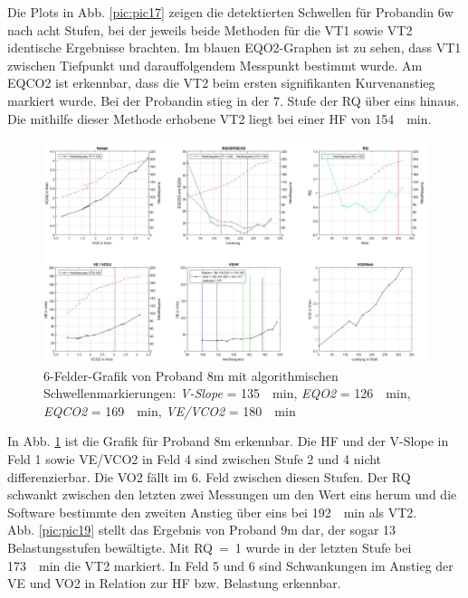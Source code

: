 %
Die Plots in Abb. \ref{pic:pic17} zeigen die detektierten Schwellen für Probandin 6w nach acht Stufen, bei der jeweils beide Methoden für die VT1 sowie VT2 identische Ergebnisse brachten. Im blauen \gls{EQO2}-Graphen ist zu sehen, dass VT1 zwischen Tiefpunkt und darauffolgendem Messpunkt bestimmt wurde. Am \gls{EQCO2} ist erkennbar, dass die VT2 beim ersten signifikanten Kurvenanstieg markiert wurde. Bei der Probandin stieg in der 7. Stufe der RQ über eins hinaus. Die mithilfe dieser Methode erhobene VT2 liegt bei einer \gls{HF} von \SI{154}{\per\minute}.
%
\begin{figure}[H]
	\centering
	\noindent\includegraphics[angle=0,width=\linewidth,keepaspectratio]{Bilder/auto_8}
	\caption[6-Felder-Grafik von Proband 8m mit algorithmischen Schwellenmarkierungen]{6-Felder-Grafik von Proband 8m mit algorithmischen Schwellenmarkierungen: \textsl{V-Slope} = \SI{135}{\per\minute}, \textsl{\gls{EQO2}} = \SI{126}{\per\minute}, \textsl{\gls{EQCO2}} = \SI{169}{\per\minute}, \textsl{\gls{VE}/\gls{VCO2}} = \SI{180}{\per\minute}}
	\label{pic:pic18}
\end{figure}
%
In Abb. \ref{pic:pic18} ist die Grafik für Proband 8m erkennbar. Die \gls{HF} und der V-Slope in Feld 1 sowie \gls{VE}/\gls{VCO2} in Feld 4 sind zwischen Stufe 2 und 4 nicht differenzierbar. Die \gls{VO2} fällt im 6. Feld zwischen diesen Stufen. Der RQ schwankt zwischen den letzten zwei Messungen um den Wert eins herum und die Software bestimmte den zweiten Anstieg über eins bei \SI{192}{\per\minute} als VT2.\\
Abb. \ref{pic:pic19} stellt das Ergebnis von Proband 9m dar, der sogar 13 Belastungsstufen bewältigte. Mit RQ~=~1 wurde in der letzten Stufe bei \SI{173}{\per\minute} die VT2 markiert. In Feld 5 und 6 sind Schwankungen im Anstieg der \gls{VE} und \gls{VO2} in Relation zur \gls{HF} bzw. Belastung erkennbar.
